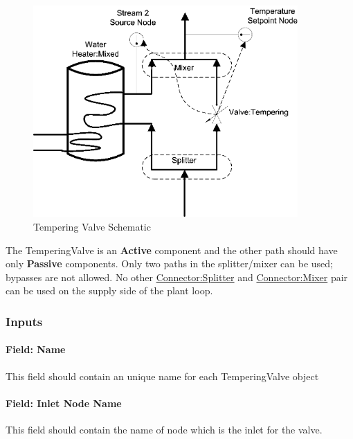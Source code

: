 \begin{figure}[hbtp] %
\centering
\includegraphics[width=0.9\textwidth, height=0.9\textheight, keepaspectratio=true]{media/image208.png}
\caption{Tempering Valve Schematic \protect \label{fig:tempering-valve-schematic}}
\end{figure}

The TemperingValve is an \textbf{Active} component and the other path should have only \textbf{Passive} components. Only two paths in the splitter/mixer can be used; bypasses are not allowed. No other \hyperref[connectorsplitter]{Connector:Splitter} and \hyperref[connectormixer]{Connector:Mixer} pair can be used on the supply side of the plant loop.

\subsubsection{Inputs}\label{inputs-2-029}

\paragraph{Field: Name}\label{field-name-2-028}

This field should contain an unique name for each TemperingValve object

\paragraph{Field: Inlet Node Name}\label{field-inlet-node-name-003}

This field should contain the name of node which is the inlet for the valve.


